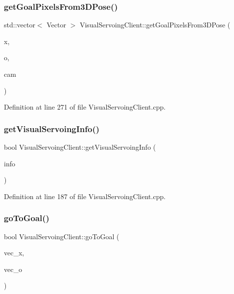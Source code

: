\subsubsection{\texorpdfstring{get\+Goal\+Pixels\+From3\+D\+Pose()}{getGoalPixelsFrom3DPose()}}
{\footnotesize\ttfamily std\+::vector$<$ Vector $>$ Visual\+Servoing\+Client\+::get\+Goal\+Pixels\+From3\+D\+Pose (\begin{DoxyParamCaption}\item[{const yarp\+::sig\+::\+Vector \&}]{x,  }\item[{const yarp\+::sig\+::\+Vector \&}]{o,  }\item[{const Cam\+Sel \&}]{cam }\end{DoxyParamCaption})\hspace{0.3cm}{\ttfamily [override]}}



Definition at line 271 of file Visual\+Servoing\+Client.\+cpp.

\mbox{\label{classVisualServoingClient_a4c416452594f40ef8c752b77b79c136f}} 
\subsubsection{\texorpdfstring{get\+Visual\+Servoing\+Info()}{getVisualServoingInfo()}}
{\footnotesize\ttfamily bool Visual\+Servoing\+Client\+::get\+Visual\+Servoing\+Info (\begin{DoxyParamCaption}\item[{yarp\+::os\+::\+Bottle \&}]{info }\end{DoxyParamCaption})\hspace{0.3cm}{\ttfamily [override]}}



Definition at line 187 of file Visual\+Servoing\+Client.\+cpp.

\mbox{\label{classVisualServoingClient_aa83b1b0be446896611b7c7675d716905}} 
\subsubsection{\texorpdfstring{go\+To\+Goal()}{goToGoal()}\hspace{0.1cm}{\footnotesize\ttfamily [1/2]}}
{\footnotesize\ttfamily bool Visual\+Servoing\+Client\+::go\+To\+Goal (\begin{DoxyParamCaption}\item[{const yarp\+::sig\+::\+Vector \&}]{vec\+\_\+x,  }\item[{const yarp\+::sig\+::\+Vector \&}]{vec\+\_\+o }\end{DoxyParamCaption})\hspace{0.3cm}{\ttfamily [override]}}



